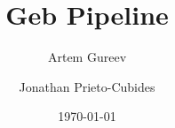 \releaseval{\today}
\date{\today}

\title{Geb Pipeline}

\begin{authgrp}
\author{Artem Gureev}
\author{\;Jonathan Prieto-Cubides}
\end{authgrp}